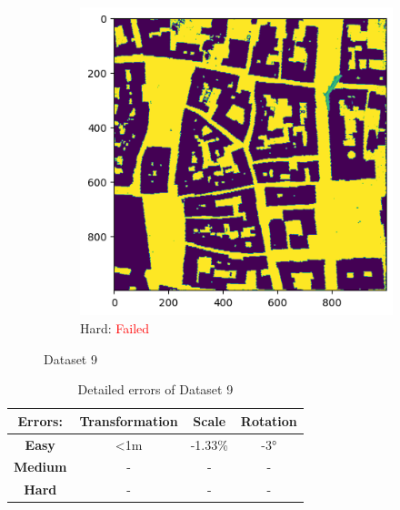 \documentclass[11pt]{article}
\begin{document}
\begin{figure}[p]
        \vspace{1em}

        \begin{subfigure}{0.45\textwidth}
            \centering
            \includegraphics[width=\linewidth]{images/full/hard/5_6_1_hard}
            \caption{Hard: \textcolor{red}{Failed}}
            \label{fig:5_6_1_hard}
        \end{subfigure}
        \hfill

        \caption{Dataset 9}
        \label{fig:res_5_6_1}
    \end{figure}

    \begin{table}[p]
        \centering
        \begin{tabular}{|c|c|c|c|}
          \hline
          \textbf{Errors:} & \textbf{Transformation} & \textbf{Scale} & \textbf{Rotation} \\
          \hline
          \textbf{Easy}   & <1m  & -1.33\% & -3° \\
          \hline
          \textbf{Medium} & -  & - & - \\
          \hline
          \textbf{Hard}   & -  & - & - \\
          \hline
        \end{tabular}
        \caption{Detailed errors of Dataset 9}
        \label{tab:tab_9}
    \end{table}
\end{document}
